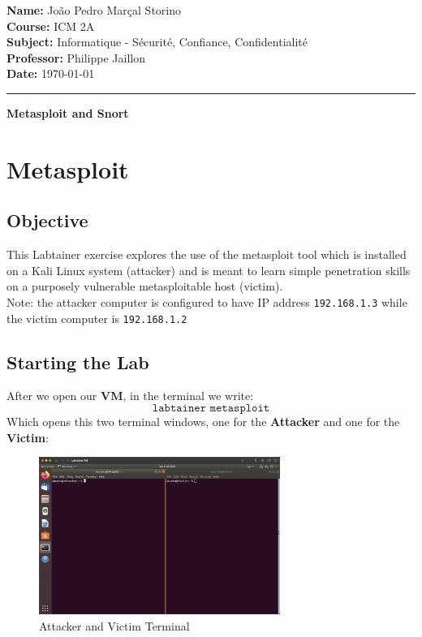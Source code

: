\documentclass[a4paper,11pt]{article} %
\begin{document}
\begin{flushleft}
    \textbf{Name:} João Pedro Marçal Storino \\
    \textbf{Course:} ICM 2A \\
    \textbf{Subject:} Informatique - Sécurité, Confiance, Confidentialité \\
    \textbf{Professor:} Philippe Jaillon \\
    \textbf{Date:} \today
\end{flushleft}

\noindent\rule{\textwidth}{0.4mm} %

\tableofcontents
\newpage

\begin{center}
    {\LARGE \textbf{Metasploit and Snort}} %
\end{center}

\section{Metasploit}
\subsection{Objective}
This Labtainer exercise explores the use of the metasploit tool which is installed on a Kali Linux
system (attacker) and is meant to learn simple penetration skills on a purposely vulnerable
metasploitable host (victim).\\
Note: the attacker computer is configured to have IP address \texttt{192.168.1.3} while the victim
computer is \texttt{192.168.1.2}

\subsection{Starting the Lab}
After we open our \textbf{VM}, in the terminal we write:
\[\texttt{labtainer metasploit}\]
Which opens this two terminal windows, one for the \textbf{Attacker} and one for the \textbf{Victim}:

\begin{figure}[h!]
    \centering
    \includegraphics[width=0.7\textwidth]{images/01.png}
    \caption{Attacker and Victim Terminal}
\end{figure}
\end{document}
